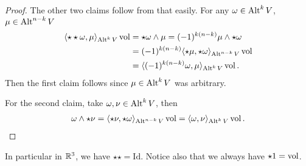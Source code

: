 \documentclass[../master_thesis.tex]{subfiles}
\begin{document}
\begin{proof}
    The other two claims follow from that easily. For any $\omega \in 
    {\text{Alt}^{k}\,V}$, $\mu \in {\text{Alt}^{n-k}\,V}$
    \begin{align*}
        \langle \star \star \omega , \mu \rangle_{{\text{Alt}^{k}\,V}}\operatorname{vol}
        &= \star \omega \wedge \mu
        = (-1)^{k(n-k)} \mu \wedge \star \omega 
        \\ &= (-1)^{k(n-k)} \langle \star \mu , \star \omega \rangle_{{\text{Alt}^{n-k}\,V}} \operatorname{vol}
        \\ &= \langle (-1)^{k(n-k)} \omega , \mu \rangle_{{\text{Alt}^{k}\,V}} \operatorname{vol}.
    \end{align*}
    Then the first claim follows since $\mu \in {\text{Alt}^{k}\,V}$ was
    arbitrary.

    For the second claim, take $\omega, \nu \in {\text{Alt}^{k}\,V}$, then
    \begin{align*}
        \omega \wedge \star \nu = \langle \star \nu , \star \omega \rangle _{{\text{Alt}^{n-k}\,V}} \operatorname{vol}
        = \langle \omega , \nu \rangle _{{\text{Alt}^{k}\,V}} \operatorname{vol}.
    \end{align*}
\end{proof}
In particular in $\mathbb{R}^3$, we have 
$\star\star = \text{Id}$. Notice also 
that we always have $\star 1 = \operatorname{vol}$.
\end{document}
